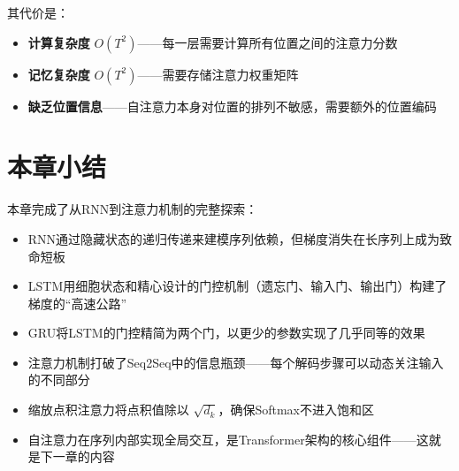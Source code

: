 其代价是：
\begin{itemize}
    \item \textbf{计算复杂度} $O(T^2)$——每一层需要计算所有位置之间的注意力分数
    \item \textbf{记忆复杂度} $O(T^2)$——需要存储注意力权重矩阵
    \item \textbf{缺乏位置信息}——自注意力本身对位置的排列不敏感，需要额外的位置编码
\end{itemize}

\section{本章小结}

本章完成了从RNN到注意力机制的完整探索：
\begin{itemize}
    \item RNN通过隐藏状态的递归传递来建模序列依赖，但梯度消失在长序列上成为致命短板
    \item LSTM用细胞状态和精心设计的门控机制（遗忘门、输入门、输出门）构建了梯度的``高速公路''
    \item GRU将LSTM的门控精简为两个门，以更少的参数实现了几乎同等的效果
    \item 注意力机制打破了Seq2Seq中的信息瓶颈——每个解码步骤可以动态关注输入的不同部分
    \item 缩放点积注意力将点积值除以 $\sqrt{d_k}$，确保Softmax不进入饱和区
    \item 自注意力在序列内部实现全局交互，是Transformer架构的核心组件——这就是下一章的内容
\end{itemize}
